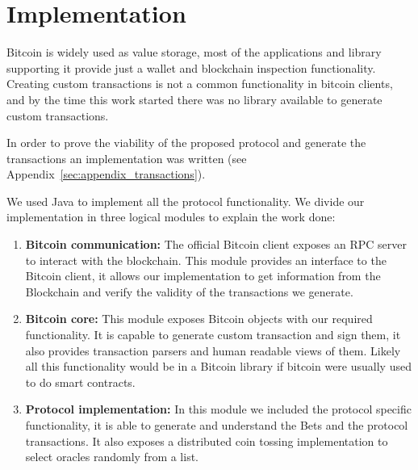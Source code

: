 \section{Implementation}

Bitcoin is widely used as value storage, most of the applications and library
  supporting it provide just a wallet and blockchain inspection functionality.
Creating custom transactions is not a common functionality in bitcoin clients,
  and by the time this work started there was no library available to generate
  custom transactions.

In order to prove the viability of the proposed protocol and generate the
  transactions an implementation
  was written (see Appendix~\ref{sec:appendix_transactions}).

We used Java to implement all the protocol functionality.
We divide our implementation in three logical modules to explain the work done:
\begin{enumerate}
\item \textbf{Bitcoin communication:}
The official Bitcoin client exposes an RPC server to interact with the
  blockchain.
This module provides an interface to the Bitcoin client, it allows our
  implementation to get information from the Blockchain and verify the
  validity of the transactions we generate.

\item \textbf{Bitcoin core:}
This module exposes Bitcoin objects with our required functionality.
It is capable to generate custom transaction and sign them, it also
  provides transaction parsers and human readable views of them.
Likely all this functionality would be in a Bitcoin library if bitcoin
  were usually used to do smart contracts.

\item \textbf{Protocol implementation:}
In this module we included the protocol specific functionality, it is able
  to generate and understand the Bets and the protocol transactions.
It also exposes a distributed coin tossing implementation to select oracles
  randomly from a list.
\end{enumerate}

